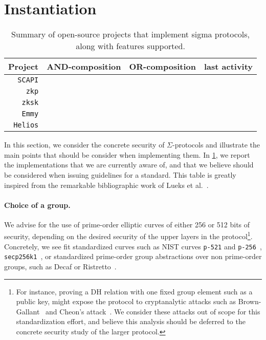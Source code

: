\documentclass[runningheads]{llncs}
\begin{document}
\section{Instantiation }

\begin{table}[t]
  \caption{Summary of open-source projects that implement sigma protocols, along with features supported.
  \label{table:implementations}}
  \centering
\begin{tabular}{rccc}
  Project & AND-composition & OR-composition & last activity \\
  \hline
  \verb|SCAPI| \cite{scapi}\\
  \verb|zkp| \cite{zkp}\\
  \verb|zksk| \cite{zksk}\\
  \verb|Emmy|\\
  \verb|Helios| \cite{USENIX:Adida08} \\
  \hline
\end{tabular}
\end{table}

In this section, we consider the concrete security of $\Sigma$-protocols and illustrate the main points that should be consider when implementing them.
In \cref{table:implementations}, we report the implementations that we are currently aware of, and that we believe should be considered when issuing guidelines for a standard.
This table is greatly inspired from the remarkable bibliographic work of Lueks et al.~\cite{zksk}.
\paragraph{Choice of a group.} We advise for the use of prime-order elliptic curves of either 256 or 512 bits of security, depending on the desired security of the upper layers in the protocol\footnote{For instance, proving a DH relation with one fixed group element such as a public key, might expose the protocol to cryptanalytic attacks such as Brown-Gallant~\cite{EPRINT:BroGal04} and Cheon’s attack~\cite{EC:Cheon06}. We consider these attacks out of scope for this standardization effort, and believe this analysis should be deferred to the concrete security study of the larger protocol.}.
Concretely, we see fit standardized curves such as NIST curves \verb|p-521| and \verb|p-256|~\cite{fips2}, \verb|secp256k1|~\cite{SECG}, or standardized prime-order group abstractions over non prime-order groups, such as Decaf or Ristretto~\cite{cfrg-ristretto-decaf}.
\end{document}
